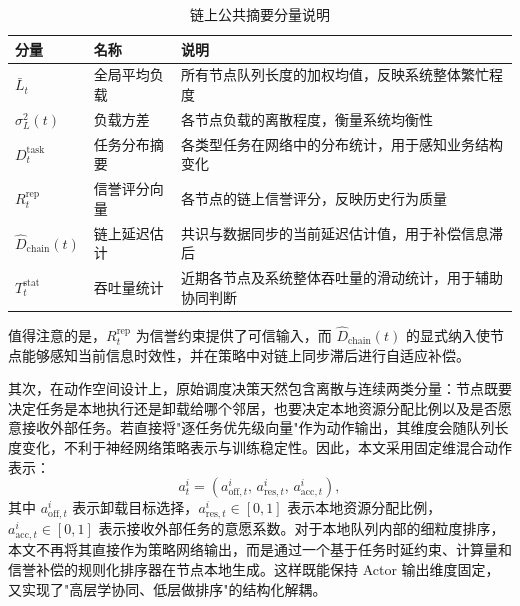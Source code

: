 \begin{table}[htbp]
\centering
\caption{链上公共摘要分量说明}
\label{tab:summary}
\begin{tabularx}{\textwidth}{P{2.3cm}P{2.2cm}Y}
\toprule
分量 & 名称 & 说明 \\
\midrule
$\bar{L}_t$ & 全局平均负载 & 所有节点队列长度的加权均值，反映系统整体繁忙程度 \\
$\sigma_L^2(t)$ & 负载方差 & 各节点负载的离散程度，衡量系统均衡性 \\
$D_t^{\mathrm{task}}$ & 任务分布摘要 & 各类型任务在网络中的分布统计，用于感知业务结构变化 \\
$R_t^{\mathrm{rep}}$ & 信誉评分向量 & 各节点的链上信誉评分，反映历史行为质量 \\
$\hat{D}_{\mathrm{chain}}(t)$ & 链上延迟估计 & 共识与数据同步的当前延迟估计值，用于补偿信息滞后 \\
$T_t^{\mathrm{stat}}$ & 吞吐量统计 & 近期各节点及系统整体吞吐量的滑动统计，用于辅助协同判断 \\
\bottomrule
\end{tabularx}
\end{table}

值得注意的是，$R_t^{\mathrm{rep}}$ 为信誉约束提供了可信输入，而 $\hat{D}_{\mathrm{chain}}(t)$ 的显式纳入使节点能够感知当前信息时效性，并在策略中对链上同步滞后进行自适应补偿。

其次，在动作空间设计上，原始调度决策天然包含离散与连续两类分量：节点既要决定任务是本地执行还是卸载给哪个邻居，也要决定本地资源分配比例以及是否愿意接收外部任务。若直接将"逐任务优先级向量"作为动作输出，其维度会随队列长度变化，不利于神经网络策略表示与训练稳定性。因此，本文采用固定维混合动作表示：
\begin{equation}
  a_t^i = \left(a_{\mathrm{off},t}^i,\,a_{\mathrm{res},t}^i,\,a_{\mathrm{acc},t}^i\right),
  \label{eq:hybrid_action}
\end{equation}
其中 $a_{\mathrm{off},t}^i$ 表示卸载目标选择，$a_{\mathrm{res},t}^i\in[0,1]$ 表示本地资源分配比例，$a_{\mathrm{acc},t}^i\in[0,1]$ 表示接收外部任务的意愿系数。对于本地队列内部的细粒度排序，本文不再将其直接作为策略网络输出，而是通过一个基于任务时延约束、计算量和信誉补偿的规则化排序器在节点本地生成。这样既能保持 Actor 输出维度固定，又实现了"高层学协同、低层做排序"的结构化解耦。

